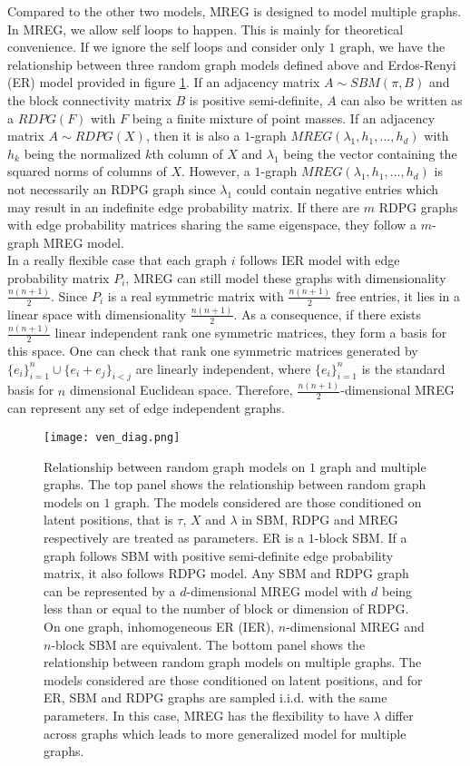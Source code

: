 \documentclass[10pt,journal,compsoc]{IEEEtran}
\begin{document}
\noindent Compared to the other two models, MREG is designed to model multiple graphs. In MREG, we allow self loops to happen. This is mainly for theoretical convenience. If we ignore the self loops and consider only $1$ graph, we have the relationship between three random graph models defined above and Erdos-Renyi (ER) model provided in figure \ref{fig:ven}. If an adjacency matrix $A \sim SBM(\pi,B)$ and the block connectivity matrix $B$ is positive semi-definite, $A$ can also be written as a $RDPG(F)$ with $F$ being a finite mixture of point masses. If an adjacency matrix $A \sim RDPG(X)$, then it is also a $1$-graph $MREG(\lambda_1,h_1,...,h_d)$ with $h_k$ being the normalized $k$th column of $X$ and $\lambda_1$ being the vector containing the squared norms of columns of $X$. However, a $1$-graph $MREG(\lambda_1,h_1,...,h_d)$ is not necessarily an RDPG graph since $\lambda_1$ could contain negative entries which may result in an indefinite edge probability matrix. If there are $m$ RDPG graphs with edge probability matrices sharing the same eigenspace, they follow a $m$-graph MREG model. \\

\noindent In a really flexible case that each graph $i$ follows IER model with edge probability matrix $P_i$, MREG can still model these graphs with dimensionality $\frac{n(n+1)}{2}$. Since $P_i$ is a real symmetric matrix with $\frac{n(n+1)}{2}$ free entries, it lies in a linear space with dimensionality $\frac{n(n+1)}{2}$. As a consequence, if there exists $\frac{n(n+1)}{2}$ linear independent rank one symmetric matrices, they form a basis for this space. One can check that rank one symmetric matrices generated by $\{e_i\}_{i=1}^{n} \cup \{e_i+e_j\}_{i<j} $ are linearly independent, where $\{e_i\}_{i=1}^{n}$ is the standard basis for $n$ dimensional Euclidean space. Therefore, $\frac{n(n+1)}{2}$-dimensional MREG can represent any set of edge independent graphs.
\begin{figure}[!htbp]
	\centering
	\texttt{[image: ven\_diag.png]}
	\caption{Relationship between random graph models on $1$ graph and multiple graphs. The top panel shows the relationship between random graph models on $1$ graph. The models considered are those conditioned on latent positions, that is $\tau$, $X$ and $\lambda$ in SBM, RDPG and MREG respectively are treated as parameters. ER is a $1$-block SBM. If a graph follows SBM with positive semi-definite edge probability matrix, it also follows RDPG model. Any  SBM and  RDPG graph can be represented by a $d$-dimensional MREG model with $d$ being less than or equal to the number of block or dimension of RDPG. On one graph, inhomogeneous ER (IER), $n$-dimensional MREG and $n$-block SBM are equivalent. The bottom panel shows the relationship between random graph models on multiple graphs. The models considered are those conditioned on latent positions, and for ER, SBM and RDPG graphs are sampled i.i.d. with the same parameters. In this case, MREG has the flexibility to have $\lambda$ differ across graphs which leads to more generalized model for multiple graphs.}
	\label{fig:ven}
\end{figure}
\end{document}
